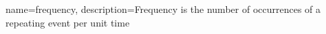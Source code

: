 {
    name=frequency,
    description={Frequency is the number of occurrences of a repeating event per unit time}
}
